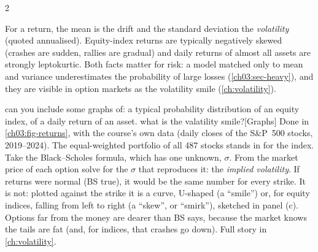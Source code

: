 \begin{paracol}{2}
\begin{finance}
For a return, the mean is the drift and the standard deviation the \emph{volatility} (quoted
annualised). Equity-index returns are typically negatively skewed (crashes are sudden, rallies are
gradual) and daily returns of almost all assets are strongly leptokurtic. Both facts matter for risk:
a model matched only to mean and variance underestimates the probability of large losses
(\cref{ch03:sec-heavy}), and they are visible in option markets as the volatility smile (\cref{ch:volatility}).
\end{finance}\begin{answer}{can you include some graphs of: a typical probability distribution of an equity index, of a daily return of an asset. what is the valatility smile?}[Graphs]
Done in \cref{ch03:fig-returns}, with the course's own data (daily closes of the S\&P~500 stocks,
2019--2024). The equal-weighted portfolio of all 487 stocks stands in for the index.
Take the Black--Scholes formula, which has one unknown, $\sigma$. From the market price of each option
solve for the $\sigma$ that reproduces it: the \emph{implied volatility}. If returns were normal (BS
true), it would be the same number for every strike. It is not: plotted against the strike it is a
curve, U-shaped (a ``smile'') or, for equity indices, falling from left to right (a ``skew'', or
``smirk''), sketched in panel (c). Options far from the money are dearer than BS says, because the
market knows the tails are fat (and, for indices, that crashes go down). Full story in \cref{ch:volatility}.
\end{answer}


\end{paracol}
